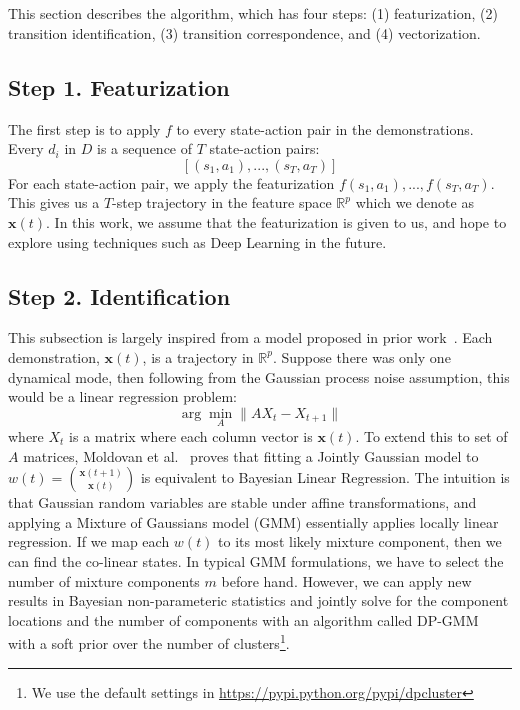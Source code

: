 %

\section{\tshfull}\label{sec:algo}
This section describes the \tsh algorithm, which has four steps: (1) featurization, (2) transition identification, (3) transition correspondence, and (4) vectorization.

\subsection{Step 1. Featurization}
The first step is to apply $f$ to every state-action pair in the demonstrations.
Every $d_i$ in $D$ is a sequence of $T$ state-action pairs:
\[
[(s_1,a_1),...,(s_T,a_T)]
\]
For each state-action pair, we apply the featurization $ f(s_1,a_1),...,f(s_T,a_T)$.
This gives us a $T$-step trajectory in the feature space $\mathbb{R}^p$ which we denote as $\mathbf{x}(t)$.
In this work, we assume that the featurization is given to us, and hope to explore using techniques such as Deep Learning in the future.

\subsection{Step 2. Identification}
This subsection is largely inspired from a model proposed in prior work~\cite{krishnan2015tsc}.
Each demonstration, $\mathbf{x}(t)$, is a trajectory in $\mathbb{R}^p$.
Suppose there was only one dynamical mode, then following from the Gaussian process noise assumption, this would be a linear regression problem:
\[
\arg\min_A \|A X_t - X_{t+1}\|
\]
where $X_t$ is a matrix where each column vector is $\mathbf{x}(t)$.
To extend this to set of $A$ matrices, Moldovan et al.~\cite{moldovan2013dirichlet} proves that fitting a Jointly Gaussian model to $w(t) = \binom{\mathbf{x}(t+1)}{\mathbf{x}(t)}$ is equivalent to Bayesian Linear Regression.
The intuition is that Gaussian random variables are stable under affine transformations, and applying a Mixture of Gaussians model (GMM) essentially applies locally linear regression.
If we map each $w(t)$ to its most likely mixture component, then we can find the co-linear states.
In typical GMM formulations, we have to select the number of mixture components $m$ before hand.
However, we can apply new results in Bayesian non-parameteric statistics and jointly solve for the component locations and the number of components with an algorithm called DP-GMM~\cite{kulis2011revisiting} with a soft prior over the number of clusters\footnote{We use the default settings in \url{https://pypi.python.org/pypi/dpcluster}}.

